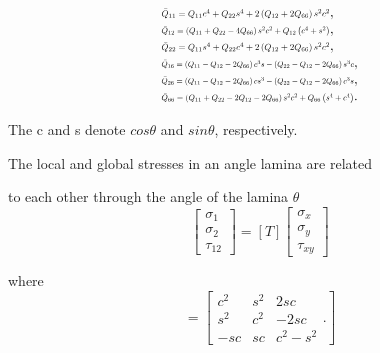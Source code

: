 \documentclass[10pt, journal]{IEEEtran}
\begin{document}
\begin{equation}
	\begin{array}{l}
		\resizebox{.35\textwidth}{!}{$\bar{Q}_{11}=Q_{11} c^{4}+Q_{22} s^{4}+2\left(Q_{12}+2
		Q_{66}\right) s^{2} c^{2}$} \textstyle{,}\\
		\resizebox{.35\textwidth}{!}{$\bar{Q}_{12}=\left(Q_{11}+Q_{22}-4 Q_{66}\right) s^{2}
		c^{2}+Q_{12}\left(c^{4}+s^{2}\right)$} \textstyle{,}\\
		\resizebox{.35\textwidth}{!}{$\bar{Q}_{22}=Q_{11} s^{4}+Q_{22} c^{4}+2\left(Q_{12}+2
		Q_{66}\right) s^{2} c^{2}$} \textstyle{,}\\
		\resizebox{.4\textwidth}{!}{$\bar{Q}_{16}=\left(Q_{11}-Q_{12}-2 Q_{66}\right) c^{3} s-\left(Q_{22}-Q_{12}-2Q_{66}\right) s^{3} c$}\textstyle{,}
		 \\ 
		\resizebox{.4\textwidth}{!}{$\bar{Q}_{26}=\left(Q_{11}-Q_{12}-2 Q_{66}\right) c s^{3}-\left(Q_{22}-Q_{12}-2 Q_{66}\right)c^{3} s$}\textstyle{,}
		 \\ 
	\resizebox{.4\textwidth}{!}	{$\bar{Q}_{66}=\left(Q_{11}+Q_{22}-2 Q_{12}-2 Q_{66}\right)
	s^{2}c^{2}+Q_{66}\left(s^{4}+c^{4}\right)$}\textstyle{.}\\
	\end{array}
\end{equation}


The c and s denote $cos\theta $ and $sin\theta $, respectively.

The local and global stresses in an angle lamina are related

to each other through the angle of the lamina $\theta $
\begin{equation}\left[\begin{array}{l}\sigma _{1} \\ \sigma _{2} \\ \tau_{12}\end{array}\right]=[T]\left[\begin{array}{l}\sigma _{x} \\ \sigma _{y} \\\tau_{xy}\end{array}\right]
\end{equation}

where
\begin{equation}[T]=\left[\begin{array}{ccc}c^{2} & s^{2} & 2 s c \\ s^{2} & c^{2} & -2 s c \\ -s c & s c &c^{2}-s^{2}\end{array}\textstyle{.}\right] 
\end{equation}
\end{document}

